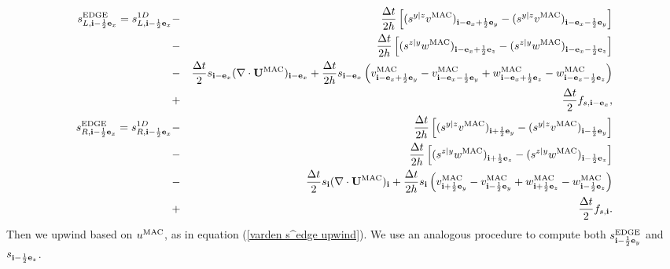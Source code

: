 \begin{eqnarray}
s_{L,{\bf i}-\frac{1}{2}{\bf e}_x}^{\rm EDGE} = s_{L,{\bf i}-\frac{1}{2}{\bf e}_x}^{1D} &-& \frac{\Delta t}{2h}\left[(s^{y|z}v^{\rm MAC})_{{\bf i}-{\bf e}_x+\frac{1}{2}{\bf e}_y}-({s^{y|z}v^{\rm MAC})_{{\bf i}-{\bf e}_x-\frac{1}{2}{\bf e}_y}}\right] \nonumber \\
&-& \frac{\Delta t}{2h}\left[(s^{z|y}w^{\rm MAC})_{{\bf i}-{\bf e}_x+\frac{1}{2}{\bf e}_z}-({s^{z|y}w^{\rm MAC})_{{\bf i}-{\bf e}_x-\frac{1}{2}{\bf e}_z}}\right] \nonumber \\
&-& \frac{\Delta t}{2}s_{{\bf i}-{\bf e}_x}(\nabla\cdot{\bf U}^{\rm MAC})_{{\bf i}-{\bf e}_x} + \frac{\Delta t}{2h}s_{{\bf i}-{\bf e}_x}\left(v_{{\bf i}-{\bf e}_x+\frac{1}{2}{\bf e}_y}^{\rm MAC}-v_{{\bf i}-{\bf e}_x-\frac{1}{2}{\bf e}_y}^{\rm MAC}+w_{{\bf i}-{\bf e}_x+\frac{1}{2}{\bf e}_z}^{\rm MAC}-w_{{\bf i}-{\bf e}_x-\frac{1}{2}{\bf e}_z}^{\rm MAC}\right) \nonumber \\
&+& \frac{\Delta t}{2}f_{s,{\bf i}-{\bf e}_x}, \\
s_{R,{\bf i}-\frac{1}{2}{\bf e}_x}^{\rm EDGE} = s_{R,{\bf i}-\frac{1}{2}{\bf e}_x}^{1D} &-& \frac{\Delta t}{2h}\left[(s^{y|z}v^{\rm MAC})_{{\bf i}+\frac{1}{2}{\bf e}_y}-({s^{y|z}v^{\rm MAC})_{{\bf i}-\frac{1}{2}{\bf e}_y}}\right] \nonumber \\
&-& \frac{\Delta t}{2h}\left[(s^{z|y}w^{\rm MAC})_{{\bf i}+\frac{1}{2}{\bf e}_z}-({s^{z|y}w^{\rm MAC})_{{\bf i}-\frac{1}{2}{\bf e}_z}}\right] \nonumber \\
&-& \frac{\Delta t}{2}s_{{\bf i}}(\nabla\cdot{\bf U}^{\rm MAC})_{{\bf i}} + \frac{\Delta t}{2h}s_{{\bf i}}\left(v_{{\bf i}+\frac{1}{2}{\bf e}_y}^{\rm MAC}-v_{{\bf i}-\frac{1}{2}{\bf e}_y}^{\rm MAC}+w_{{\bf i}+\frac{1}{2}{\bf e}_z}^{\rm MAC}-w_{{\bf i}-\frac{1}{2}{\bf e}_z}^{\rm MAC}\right) \nonumber \\
&+& \frac{\Delta t}{2}f_{s,{\bf i}}.
\end{eqnarray}
Then we upwind based on $u^{\rm MAC}$, as in equation (\ref{varden s^edge
  upwind}).  We use an analogous procedure to compute both
$s_{{\bf i}-\frac{1}{2}{\bf e}_y}^{\rm EDGE}$ and $s_{{\bf i}-\frac{1}{2}{\bf e}_z}$.

